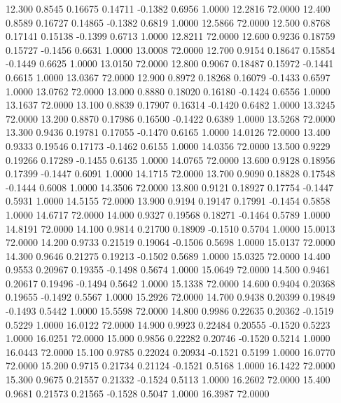  12.300   0.8545   0.16675   0.14711  -0.1382   0.6956   1.0000  12.2816  72.0000
  12.400   0.8589   0.16727   0.14865  -0.1382   0.6819   1.0000  12.5866  72.0000
  12.500   0.8768   0.17141   0.15138  -0.1399   0.6713   1.0000  12.8211  72.0000
  12.600   0.9236   0.18759   0.15727  -0.1456   0.6631   1.0000  13.0008  72.0000
  12.700   0.9154   0.18647   0.15854  -0.1449   0.6625   1.0000  13.0150  72.0000
  12.800   0.9067   0.18487   0.15972  -0.1441   0.6615   1.0000  13.0367  72.0000
  12.900   0.8972   0.18268   0.16079  -0.1433   0.6597   1.0000  13.0762  72.0000
  13.000   0.8880   0.18020   0.16180  -0.1424   0.6556   1.0000  13.1637  72.0000
  13.100   0.8839   0.17907   0.16314  -0.1420   0.6482   1.0000  13.3245  72.0000
  13.200   0.8870   0.17986   0.16500  -0.1422   0.6389   1.0000  13.5268  72.0000
  13.300   0.9436   0.19781   0.17055  -0.1470   0.6165   1.0000  14.0126  72.0000
  13.400   0.9333   0.19546   0.17173  -0.1462   0.6155   1.0000  14.0356  72.0000
  13.500   0.9229   0.19266   0.17289  -0.1455   0.6135   1.0000  14.0765  72.0000
  13.600   0.9128   0.18956   0.17399  -0.1447   0.6091   1.0000  14.1715  72.0000
  13.700   0.9090   0.18828   0.17548  -0.1444   0.6008   1.0000  14.3506  72.0000
  13.800   0.9121   0.18927   0.17754  -0.1447   0.5931   1.0000  14.5155  72.0000
  13.900   0.9194   0.19147   0.17991  -0.1454   0.5858   1.0000  14.6717  72.0000
  14.000   0.9327   0.19568   0.18271  -0.1464   0.5789   1.0000  14.8191  72.0000
  14.100   0.9814   0.21700   0.18909  -0.1510   0.5704   1.0000  15.0013  72.0000
  14.200   0.9733   0.21519   0.19064  -0.1506   0.5698   1.0000  15.0137  72.0000
  14.300   0.9646   0.21275   0.19213  -0.1502   0.5689   1.0000  15.0325  72.0000
  14.400   0.9553   0.20967   0.19355  -0.1498   0.5674   1.0000  15.0649  72.0000
  14.500   0.9461   0.20617   0.19496  -0.1494   0.5642   1.0000  15.1338  72.0000
  14.600   0.9404   0.20368   0.19655  -0.1492   0.5567   1.0000  15.2926  72.0000
  14.700   0.9438   0.20399   0.19849  -0.1493   0.5442   1.0000  15.5598  72.0000
  14.800   0.9986   0.22635   0.20362  -0.1519   0.5229   1.0000  16.0122  72.0000
  14.900   0.9923   0.22484   0.20555  -0.1520   0.5223   1.0000  16.0251  72.0000
  15.000   0.9856   0.22282   0.20746  -0.1520   0.5214   1.0000  16.0443  72.0000
  15.100   0.9785   0.22024   0.20934  -0.1521   0.5199   1.0000  16.0770  72.0000
  15.200   0.9715   0.21734   0.21124  -0.1521   0.5168   1.0000  16.1422  72.0000
  15.300   0.9675   0.21557   0.21332  -0.1524   0.5113   1.0000  16.2602  72.0000
  15.400   0.9681   0.21573   0.21565  -0.1528   0.5047   1.0000  16.3987  72.0000
